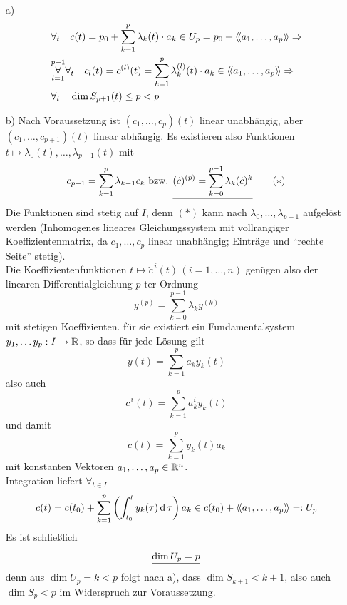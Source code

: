 \begin{beweis} \(\)
 \begin{enumerate}
  \item[a)]
  \begin{align*}
   &\forall_t \quad c(t) = p_0 + \sum_{k=1}^p \lambda_k(t) \cdot a_k \in U_p = p_0 + \left\langle\!\left\langle a_1, \dots, a_p \right\rangle\!\right\rangle \Rightarrow \\
   &\overset{p+1}{\underset{l=1}\forall} \forall_t \quad c_l(t)= c^{(l)}(t) = \sum_{k=1}^p \lambda_k^{(l)}(t)\cdot a_k \in \left\langle\!\left\langle a_1, \dots, a_p \right\rangle\!\right\rangle \Rightarrow \\
   & \forall_t \quad \dim S_{p+1}(t) \le p < p
  \end{align*}
  \item[b)] Nach Voraussetzung ist \((c_1, \dots, c_p)(t) \) linear unabhängig, aber \((c_1, \dots, c_{p+1})(t) \) linear abhängig. Es existieren also Funktionen \(t \mapsto \lambda_0(t), \dots, \lambda_{p-1}(t)\) mit 
  \begin{align*}
   c_{p+1} = \sum_{k=1}^p \lambda_{k-1} c_k \text{ bzw. } \uline{(\dot c)^{(p)} = \sum_{k=0}^{p-1} \lambda_k (\dot c)^k} \tag{\(\ast\)}
  \end{align*}
  Die Funktionen sind stetig auf \(I\), denn \((\ast)\) kann nach \(\lambda_0, \dots, \lambda_{p-1}\) aufgelöst werden (Inhomogenes lineares Gleichungssystem mit vollrangiger Koeffizientenmatrix, da \(c_1, \dots, c_p\) linear unabhängig; Einträge und "`rechte Seite"' stetig). \\
  Die Koeffizientenfunktionen \(t \mapsto \dot c^{\,i}(t) \, (i=1,\dots, n)\) genügen also der linearen Differentialgleichung \(p\)-ter Ordnung
  \[
   y^{(p)} = \sum_{k=0}^{p-1} \lambda_k y^{(k)}
  \]
  mit stetigen Koeffizienten.
  für sie existiert ein Fundamentalsystem \(y_1, \dots y_p : I \to \mathbb{R}\), so dass für jede Lösung gilt
  \[
   y(t)=\sum_{k=1}^p a_k y_k(t)
  \]
  also auch
  \[
   \dot c^{\,i}(t)=\sum_{k=1}^p a_k^i y_k(t)
  \]
  und damit
  \[
   \dot c(t)=\sum_{k=1}^p y_k(t) a_k
  \]
  mit konstanten Vektoren \(a_1, \dots, a_p \in \mathbb{R}^n\). \\
  Integration liefert \(\forall_{t \in I}\)
  \[
   c(t)= c(t_0) + \sum_{k=1}^p \left(\int_{t_0}^t y_k(\tau) \operatorname{d} \tau \right) a_k \in c(t_0) + \left\langle\!\left\langle a_1, \dots, a_p \right\rangle\!\right\rangle =: U_p
  \]
  Es ist schließlich 
  \[
  \uline{\dim U_p =p}
  \] 
  denn aus \(\dim U_p = k < p\) folgt nach a), dass \( \dim S_{k+1} < k+1 \), also auch \(\dim S_p <p\) im Widerspruch zur Voraussetzung.
 \end{enumerate}
  
\end{beweis}


